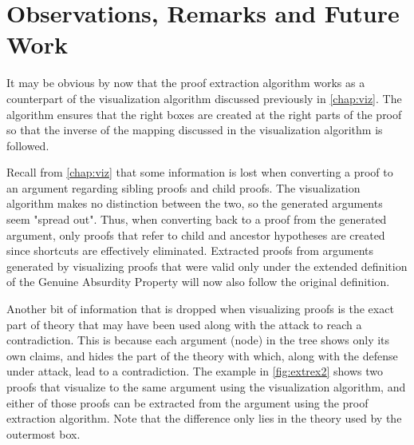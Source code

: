 \documentclass[11pt,twoside,a4paper]{report}
\begin{document}
\section{Observations, Remarks and Future Work}
It may be obvious by now that the proof extraction algorithm works as a counterpart of the visualization algorithm discussed previously in \autoref{chap:viz}. The algorithm ensures that the right boxes are created at the right parts of the proof so that the inverse of the mapping discussed in the visualization algorithm is followed.

Recall from \autoref{chap:viz} that some information is lost when converting a proof to an argument regarding sibling proofs and child proofs. The visualization algorithm makes no distinction between the two, so the generated arguments seem "spread out". Thus, when converting back to a proof from the generated argument, only proofs that refer to child and ancestor hypotheses are created since shortcuts are effectively eliminated. Extracted proofs from arguments generated by visualizing proofs that were valid only under the extended definition of the Genuine Absurdity Property will now also follow the original definition.

Another bit of information that is dropped when visualizing proofs is the exact part of theory that may have been used along with the attack to reach a contradiction. This is because each argument (node) in the tree shows only its own claims, and hides the part of the theory with which, along with the defense under attack, lead to a contradiction. The example in \autoref{fig:extrex2} shows two proofs that visualize to the same argument using the visualization algorithm, and either of those proofs can be extracted from the argument using the proof extraction algorithm. Note that the difference only lies in the theory used by the outermost box.
\end{document}

